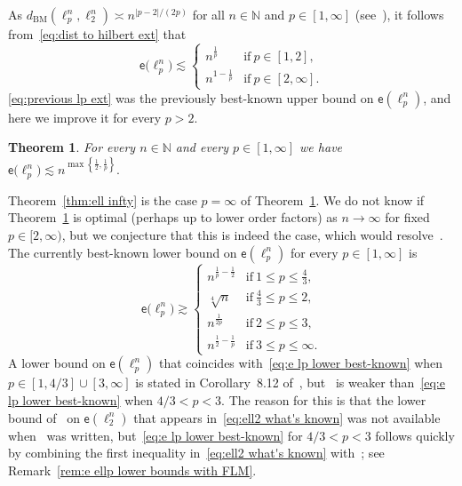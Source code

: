 \documentclass[11pt,reqno]{amsart}
\renewcommand{\le}{\leqslant}
\newtheorem{theorem}{Theorem}
\theoremstyle{remark}
\newcommand{\N}{\mathbb N}
\newcommand{\BM}{\mathrm{BM}}
\newcommand{\ee}{\mathsf{e}}
\renewcommand{\1}{\mathbf 1}
\begin{document}
As $d_{\BM}(\ell_p^n,\ell_2^n)\asymp n^{|p-2|/(2p)}$ for all $n\in \N$ and $p\in [1,\infty]$ (see~\cite[Section~8]{JL01}), it follows from~\eqref{eq:dist to hilbert ext} that
\begin{equation}\label{eq:previous lp ext}
\ee\big(\ell_p^n\big)\lesssim \left\{\begin{array}{ll}n^{\frac{1}{p}}&\mathrm{if}\ p\in [1,2],\\
n^{1-\frac{1}{p}}&\mathrm{if}\ p\in [2,\infty].\end{array}\right.
 \end{equation}
\eqref{eq:previous lp ext} was the previously best-known upper bound on $\ee(\ell_p^n)$, and here we improve it for every $p>2$.

 \begin{theorem}\label{thm:p>2} For every $n\in \N$ and every $p\in [1,\infty]$ we have
 $
 \ee\big(\ell_p^n\big)\lesssim n^{\max\left\{\frac12,\frac{1}{p}\right\}}.
 $
\end{theorem}
Theorem~\ref{thm:ell infty} is the case $p=\infty$ of Theorem~\ref{thm:p>2}. We do not know if Theorem~\ref{thm:p>2} is optimal (perhaps up to lower order factors) as $n\to \infty$ for fixed $p\in [2,\infty)$, but we conjecture that this is indeed the case, which would resolve~\cite[Problem~2]{BB05}. The currently best-known lower bound on $\ee(\ell_p^n)$ for every $p\in [1,\infty]$ is
\begin{equation}\label{eq:e lp lower best-known}
\ee\big(\ell_p^n\big)\gtrsim \left\{\begin{array}{ll} n^{\frac{1}{p}-\frac12}&\mathrm{if}\ 1\le p\le \frac43,\\
\sqrt[4]{n}&\mathrm{if}\ \frac43\le p\le 2,\\
n^{\frac{1}{2p}}&\mathrm{if}\ 2\le p\le 3,\\
n^{\frac12-\frac{1}{p}}&\mathrm{if}\ 3\le p\le \infty.\end{array}\right.
\end{equation}
 A lower bound on $\ee(\ell_p^n)$ that coincides with~\eqref{eq:e lp lower best-known} when $p\in [1,4/3]\cup[3,\infty]$ is stated in Corollary~8.12 of~\cite{BB12}, but~\cite[Corollary~8.12]{BB12} is weaker than~\eqref{eq:e lp lower best-known} when $4/3<p<3$. The reason for this is that the lower bound of~\cite{MN13-bary} on $\ee(\ell_2^n)$ that appears in~\eqref{eq:ell2 what's known} was not available when~\cite{BB12} was written, but~\eqref{eq:e lp lower best-known} for $4/3<p<3$ follows quickly by combining the first inequality in~\eqref{eq:ell2 what's known}  with~\cite{FLM77}; see Remark~\ref{rem:e ellp lower bounds with FLM}.
\end{document}
